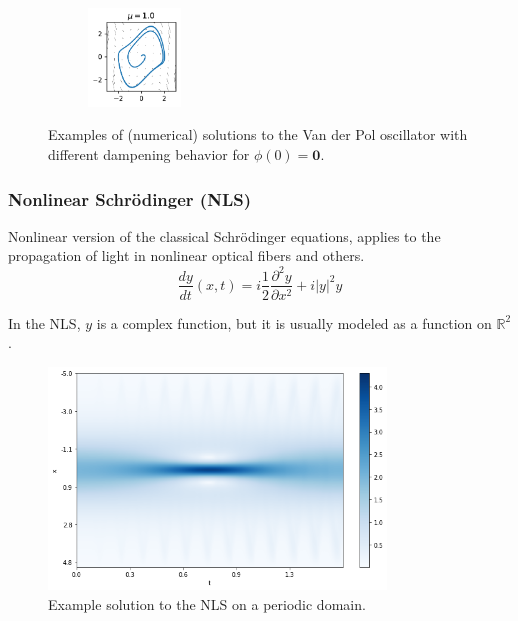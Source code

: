 \documentclass[t]{beamer}
\newcommand{\R}{\mathbb{R}}
\begin{document}
\begin{frame}
\begin{figure}[h]
\begin{subfigure}[b]{\textwidth}
	    \includegraphics[width=0.27\textwidth]{../images/vdp_statespace_mu_10.pdf}
	\end{subfigure}
	\caption{Examples of (numerical) solutions to the Van der Pol oscillator with different dampening behavior for $\phi(0)=\bm{0}$.}\label{fig:vdp_example}
    \end{figure}
\end{frame}

\begin{frame}
    \frametitle{Nonlinear Schrödinger (NLS)}
    Nonlinear version of the classical Schrödinger equations, applies to the propagation of light in nonlinear optical fibers and others.  \[
    \frac{d y}{dt}\left( x,t \right)  = i\frac{1}{2}\frac{\partial^2 y}{\partial x^2} + i|y|^2y
    \]

    \pause
    \quad

    In the NLS, $y$ is a complex function, but it is usually modeled as a function on $\R^2$.
\end{frame}

\begin{frame}
    \vfill
    \begin{figure}[h]
        \centering
        \includegraphics[width=0.8\textwidth]{nls.png}
        \caption{Example solution to the NLS on a periodic domain.}
        \label{fig:nls-example}
    \end{figure}
\end{frame}
\end{document}
